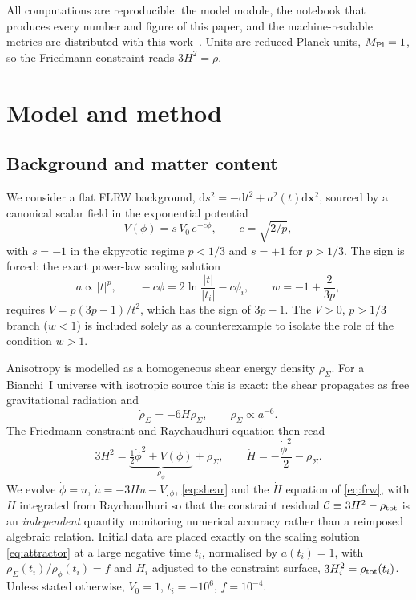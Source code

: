 \documentclass[11pt,a4paper]{article}
\newcommand{\dd}{\mathrm{d}}
\newcommand{\phidot}{\dot\phi}
\newcommand{\rhophi}{\rho_\phi}
\newcommand{\rhoSigma}{\rho_\Sigma}
\newcommand{\Mpl}{M_{\rm Pl}}
\begin{document}
All computations are reproducible: the model module, the notebook that
produces every number and figure of this paper, and the machine-readable
metrics are distributed with this work~\cite{code}. Units are reduced
Planck units, $\Mpl=1$, so the Friedmann constraint reads $3H^2=\rho$.

\section{Model and method}
\label{sec:model}

\subsection{Background and matter content}

We consider a flat FLRW background,
$\dd s^2=-\dd t^2+a^2(t)\dd\mathbf x^2$, sourced by a canonical scalar
field in the exponential potential
\begin{equation}
  V(\phi)=s\,V_0\,e^{-c\phi},\qquad c=\sqrt{2/p},
  \label{eq:potential}
\end{equation}
with $s=-1$ in the ekpyrotic regime $p<1/3$ and $s=+1$ for $p>1/3$. The
sign is forced: the exact power-law scaling solution
\begin{equation}
  a\propto|t|^p,\qquad
  -c\phi = 2\ln\!\frac{|t|}{|t_i|}-c\phi_i,\qquad
  w=-1+\frac{2}{3p},
  \label{eq:attractor}
\end{equation}
requires $V=p(3p-1)/t^2$, which has the sign of $3p-1$. The
$V>0$, $p>1/3$ branch ($w<1$) is included solely as a counterexample to
isolate the role of the condition $w>1$.

Anisotropy is modelled as a homogeneous shear energy density $\rhoSigma$.
For a Bianchi~I universe with isotropic source this is exact: the shear
propagates as free gravitational radiation and
\begin{equation}
  \dot\rhoSigma = -6H\rhoSigma,\qquad \rhoSigma\propto a^{-6}.
  \label{eq:shear}
\end{equation}
The Friedmann constraint and Raychaudhuri equation then read
\begin{equation}
  3H^2=\underbrace{\tfrac12\phidot^2+V(\phi)}_{\rhophi}+\rhoSigma,
  \qquad
  \dot H=-\frac{\phidot^2}{2}-\rhoSigma .
  \label{eq:frw}
\end{equation}
We evolve $\dot\phi=u$, $\dot u=-3Hu-V_{,\phi}$, \eqref{eq:shear} and the
$\dot H$ equation of \eqref{eq:frw}, with $H$ integrated from Raychaudhuri
so that the constraint residual
$\mathcal C\equiv 3H^2-\rho_{\rm tot}$ is an \emph{independent} quantity
monitoring numerical accuracy rather than a reimposed algebraic relation.
Initial data are placed exactly on the scaling solution
\eqref{eq:attractor} at a large negative time $t_i$, normalised by
$a(t_i)=1$, with $\rhoSigma(t_i)/\rhophi(t_i)=f$ and $H_i$ adjusted to the
constraint surface, $3H_i^2=\rho_{\rm tot}(t_i)$. Unless stated otherwise,
$V_0=1$, $t_i=-10^6$, $f=10^{-4}$.
\end{document}
